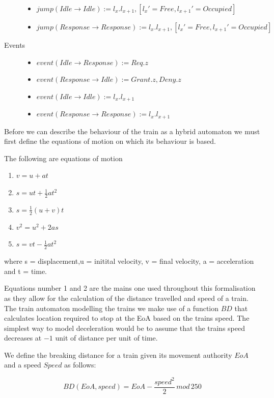\begin{mydef}
\begin{description}
\begin{itemize}
	\item $jump(Idle \to Idle) := l_x. l_{x+1} , [l_x' = Free, l_{x+1}' = Occupied]$

	\item $jump(Response \to Response) := l_x. l_{x+1} , [l_x' = Free, l_{x+1}' = Occupied]$


	\end{itemize}

\item[Events] \hspace*{0mm}
\begin{itemize}
	\item $event (Idle \to Response) := Req.z$
	\item $event(Response \to Idle) :={Grant.z,Deny.z}$
	\item $event(Idle \to Idle) := l_x.l_{x+1}$
	\item $event(Response \to Response) := l_x.l_{x+1}$	
\end{itemize}

\end{description}
\end{mydef} 
\medskip
Before we can describe the behaviour of the train as a hybrid automaton we must first define the equations of motion on which its behaviour is based.
\medskip
\begin{mydef}
The following are equations of motion
\begin{enumerate}
\item $v = u +at$
\item $s = ut + \frac{1}{2}at^2$
\item $s = \frac{1}{2}(u + v)t$
\item $v^2 = u^2 +2as$
\item $s = vt - \frac{1}{2}at^2$
\end{enumerate}
where s = displacement,u = initital velocity, v = final velocity, a = acceleration and t = time.
\end{mydef}
\medskip
Equations number 1 and 2 are the mains one used throughout this formalisation as they allow for the calculation of the distance travelled and speed of a train.
The train automaton modelling the trains we make use of a function $BD$ that calculates location required to stop at the EoA based on the trains speed. The simplest way to model deceleration would be to assume that the trains speed decreases at $-1$ unit of distance per unit of time. 
\medskip
\begin{mydef}
We define the breaking distance for a train given its movement authority $EoA$ and a speed $Speed$  as follows: 

$$ BD(EoA, speed) = EoA - \frac{speed ^2}{2} \, mod \, 250 $$
\end{mydef}
\medskip



